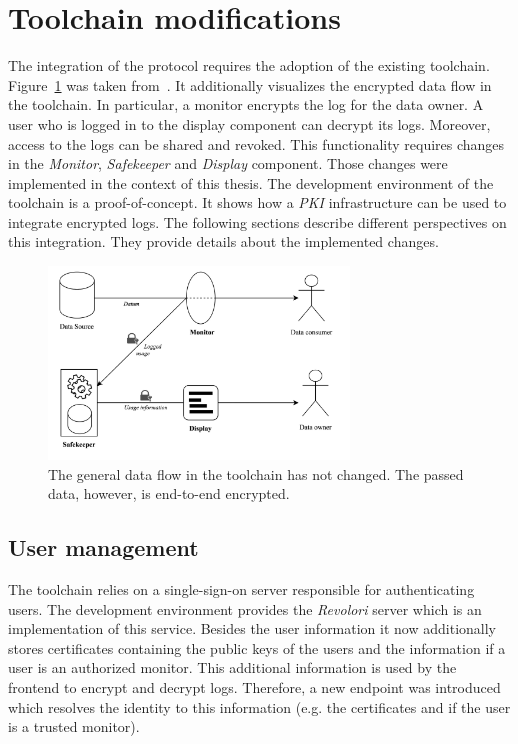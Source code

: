 \documentclass[../main.tex]{subfiles}
\begin{document}
\section{Toolchain modifications}
\label{sec:toolchain-modifications}
The integration of the protocol requires the adoption of the existing toolchain.
Figure~\ref{fig:encrypted-toolchain} was taken from~\cite{Zieglmeier2021}.
It additionally visualizes the encrypted data flow in the toolchain.
In particular, a monitor encrypts the log for the data owner.
A user who is logged in to the display component can decrypt its logs.
Moreover, access to the logs can be shared and revoked.
This functionality requires changes in the \emph{Monitor}, \emph{Safekeeper} and \emph{Display} component.
Those changes were implemented in the context of this thesis.
The development environment of the toolchain is a proof-of-concept.
It shows how a \emph{PKI} infrastructure can be used to integrate encrypted logs.
The following sections describe different perspectives on this integration.
They provide details about the implemented changes.


\begin{figure}[h!]
    \includegraphics[width=8cm]{../img/06/encrypted_toolchain.jpg}
    \centering
    \caption[Toolchain encrypted data flow]{The general data flow in the toolchain has not changed. The passed data, however, is end-to-end encrypted.}
    \label{fig:encrypted-toolchain}
\end{figure}

\subsection{User management}
The toolchain relies on a single-sign-on server responsible for authenticating users.
The development environment provides the \emph{Revolori} server which is an implementation of this service.
Besides the user information it now additionally stores certificates containing the public keys of the users and the information if a user is an authorized monitor.
This additional information is used by the frontend to encrypt and decrypt logs.
Therefore, a new endpoint was introduced which resolves the identity to this information (e.g. the certificates and if the user is a trusted monitor).
\end{document}
